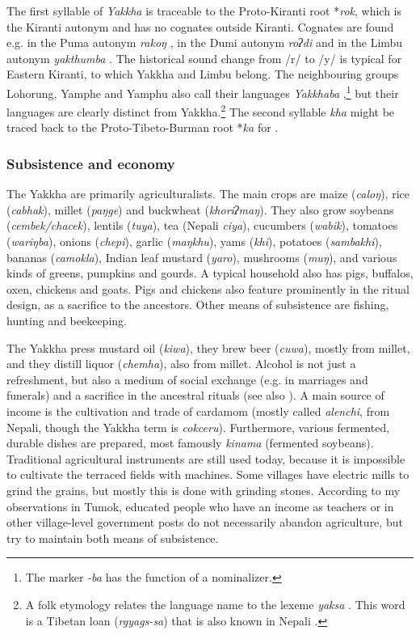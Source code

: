 The first syllable of  \emph{Yakkha} is traceable to the Proto-Kiranti root *\emph{rok}, which is the Kiranti autonym and has no cognates outside Kiranti. Cognates are found e.g. in the Puma autonym \emph{rakoŋ} \citep{Bickeletal2009Puma}, in the Dumi autonym \emph{roʔdi} \citep[413]{Driem1993A-grammar} and in the Limbu autonym \emph{yakthumba} \citep[xix]{Driem1987A-grammar}.  The historical sound change from  /r/ to /y/ is typical for Eastern Kiranti, to which Yakkha and Limbu belong. The neighbouring groups Lohorung, Yamphe and Yamphu  also call their languages \emph{Yakkhaba} \citep[347]{Driem1994The-Yakkha},\footnote{The marker \emph{-ba} has the function of a nominalizer.}  but their languages are clearly distinct from Yakkha.\footnote{A folk etymology relates the language name to the  lexeme \emph{yaksa}  \citep[87]{Kongren2007Indigenous}. This word is a Tibetan loan (\emph{rgyags-sa})  that is also known in Nepali \citep{Turner1931A-Comparative}.} The second syllable \emph{kha} might be traced back to the Proto-Tibeto-Burman root  *\emph{ka} for  \citep[174]{Matisoff2003Handbook}.

   
\subsubsection{Subsistence and economy}
 
The Yakkha are primarily agriculturalists. The main crops are maize (\emph{caloŋ}), rice (\emph{cabhak}), millet (\emph{paŋge}) and  buckwheat (\emph{khoriʔmaŋ}). They also grow soybeans (\emph{cembek/chacek}), lentils (\emph{tuya}), tea (Nepali \emph{ciya}), cucumbers (\emph{wabik}), tomatoes (\emph{wa\-riŋba}), onions (\emph{chepi}), garlic (\emph{maŋkhu}), yams (\emph{khi}), potatoes (\emph{sambakhi}), bananas (\emph{camokla}), Indian leaf mustard (\emph{yaro}), mushrooms (\emph{muŋ}), and various kinds of greens, pumpkins and gourds. A typical household also has pigs, buffalos, oxen, chickens and goats. Pigs and chickens also feature prominently in the ritual design, as a sacrifice to the ancestors. Other means of subsistence are fishing, hunting  and beekeeping.  

The Yakkha press mustard oil (\emph{kiwa}), they brew beer (\emph{cuwa}), mostly from millet, and they distill liquor (\emph{chemha}), also from millet. Alcohol is not just a refreshment, but also a medium of social exchange (e.g. in marriages and fune\-rals) and a sacrifice in the ancestral rituals (see also \citet[124]{Russell1992_Yakha}).  A main source of income is the cultivation and trade of cardamom (mostly called \emph{alenchi}, from Nepali, though the Yakkha term is \emph{cokceru}). Furthermore, various fermented, durable dishes are prepared, most famously \emph{kinama} (fermented soybeans). Traditional agricultural instruments are still used today, because it is impossible to cultivate the terraced fields with machines. Some villages have electric mills to grind the grains, but mostly this is done with grinding stones. According to my observations in Tumok, educated people who have an income as teachers or in other village-level government posts do not necessarily abandon agriculture, but try to maintain both means of subsistence. 

